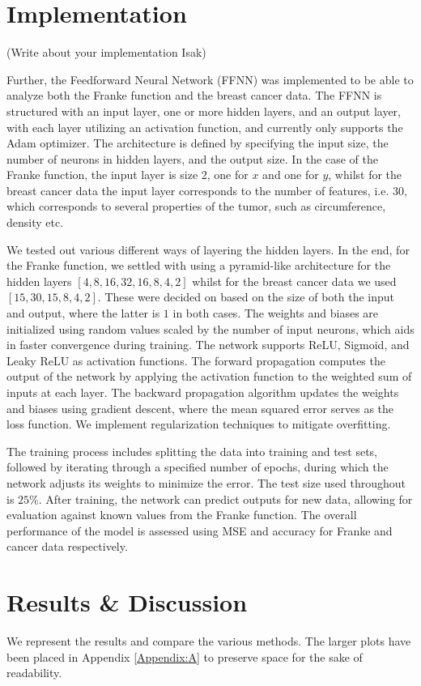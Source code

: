 \documentclass[%
reprint,
amsmath,amssymb,
aps,
]{revtex4-2}
\begin{document}
\section{Implementation}
(Write about your implementation Isak)

Further, the Feedforward Neural Network (FFNN) was implemented to be able to analyze both the Franke function and the breast cancer data. The FFNN is structured with an input layer, one or more hidden layers, and an output layer, with each layer utilizing an activation function, and currently only supports the Adam optimizer. The architecture is defined by specifying the input size, the number of neurons in hidden layers, and the output size. In the case of the Franke function, the input layer is size 2, one for $x$ and one for $y$, whilst for the breast cancer data the input layer corresponds to the number of features, i.e. $30$, which corresponds to several properties of the tumor, such as circumference, density etc. 

We tested out various different ways of layering the hidden layers. In the end, for the Franke function, we settled with using a pyramid-like architecture for the hidden layers $[4,8,16,32,16,8,4,2]$ whilst for the breast cancer data we used $[15,30,15,8,4,2]$. These were decided on based on the size of both the input and output, where the latter is $1$ in both cases. The weights and biases are initialized using random values scaled by the number of input neurons, which aids in faster convergence during training. The network supports ReLU, Sigmoid, and Leaky ReLU as activation functions. The forward propagation computes the output of the network by applying the activation function to the weighted sum of inputs at each layer. The backward propagation algorithm updates the weights and biases using gradient descent, where the mean squared error serves as the loss function. We implement regularization techniques to mitigate overfitting.

The training process includes splitting the data into training and test sets, followed by iterating through a specified number of epochs, during which the network adjusts its weights to minimize the error. The test size used throughout is $25\%$. After training, the network can predict outputs for new data, allowing for evaluation against known values from the Franke function. The overall performance of the model is assessed using MSE and accuracy for Franke and cancer data respectively.


\section{Results \& Discussion}
We represent the results and compare the various methods. The larger plots have been placed in Appendix \ref{Appendix:A} to preserve space for the sake of readability.
\end{document}
